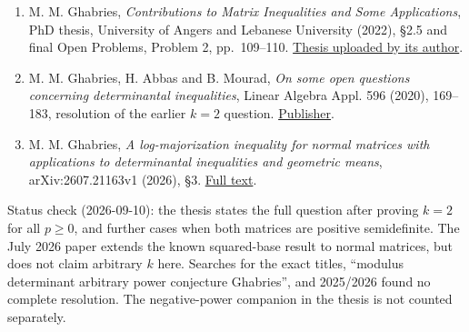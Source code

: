 \documentclass[11pt,a4paper]{article}
\providecommand{\tightlist}{\setlength{\itemsep}{0pt}\setlength{\parskip}{0pt}}
\begin{document}
\begin{enumerate}
\def\labelenumi{\arabic{enumi}.}
\tightlist
\item
  M. M. Ghabries, \emph{Contributions to Matrix Inequalities and Some
  Applications}, PhD thesis, University of Angers and Lebanese
  University (2022), §2.5 and final Open Problems, Problem 2,
  pp.~109--110.
  \href{https://www.researchgate.net/publication/361793582_Contributions_to_Matrix_Inequalities_and_Some_Applications}{Thesis
  uploaded by its author}.
\item
  M. M. Ghabries, H. Abbas and B. Mourad, \emph{On some open questions
  concerning determinantal inequalities}, Linear Algebra Appl. 596
  (2020), 169--183, resolution of the earlier \(k=2\) question.
  \href{https://doi.org/10.1016/j.laa.2020.03.009}{Publisher}.
\item
  M. M. Ghabries, \emph{A log-majorization inequality for normal
  matrices with applications to determinantal inequalities and geometric
  means}, arXiv:2607.21163v1 (2026), §3.
  \href{https://arxiv.org/html/2607.21163}{Full text}.
\end{enumerate}

Status check (2026-09-10): the thesis states the full question after
proving \(k=2\) for all \(p\ge0\), and further cases when both matrices
are positive semidefinite. The July 2026 paper extends the known
squared-base result to normal matrices, but does not claim arbitrary
\(k\) here. Searches for the exact titles, ``modulus determinant
arbitrary power conjecture Ghabries'', and 2025/2026 found no complete
resolution. The negative-power companion in the thesis is not counted
separately.
\end{document}

